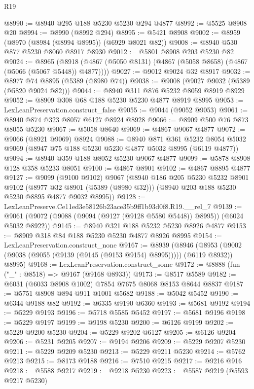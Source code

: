 \begin{lexlean}{R19}
\begin{coremodule}
@8990 := @8940 @295 @188 @5230 @5230 @294 @4877
@8992 := @5525 @8908 @20
@8994 := @8990 (@8992 @294)
@8995 := @5421 @8908
@9002 := @8959 (@8970 (@8984 (@8994 @8995)) (@6929 @8021 @82))
@9008 := @8940 @530 @877 @5230 @8060 @8917 @8930
@9012 := @5801 @8908 @203 @5230 @82
@9024 := @8965
    (@8918 (@4867 (@5050 @8131) (@4867 (@5058 @8658) (@4867 (@5066 (@5067 @5448)) @4877))))
@9027 := @9012 @9024 @32 @8917
@9032 := @8977 @74 @8895 (@5389 (@8980 @74))
@9038 := @9008 (@9027 @9032 (@5389 (@5820 @9024 @82)))
@9044 := @8940 @311 @876 @5232 @8059 @8919 @8929
@9052 := @8909 @308 @68 @188 @5230 @5230 @4877 @8919 @8995
@9053 := LexLeanPreservation.construct_false
@9055 := @9044 (@9052 @9053)
@9061 := @8940 @874 @323 @8057 @6127 @8924 @8928
@9066 := @8909 @500 @76 @873 @8055 @5230
@9067 := @5058 @8640
@9069 := @4867 @9067 @4877
@9072 := @9066 (@8921 @9069) @8924
@9088 := @8940
    @871
    @361
    @5232
    @8054
    @5032
    @9069
    (@8947 @75 @188 @5230 @5230 @4877 @5032 @8995 (@6119 @4877))
@9094 := @8940 @359 @188 @8052 @5230 @9067 @4877
@9099 := @5878 @8908 @128 @358 @5233 @8051
@9100 := @4867 @8901
@9102 := @4867 @8895 @4877
@9127 := @9099
    (@9100 @9102)
    @9067
    (@8940
      @186
      @205
      @5230
      @5232
      @8901
      @9102
      (@8977 @32 @8901 (@5389 (@8980 @32)))
      (@8940 @203 @188 @5230 @5230 @8895 @4877 @9032 @8995))
@9128 := LexLeanPreserve.Ce11ed3e58126b23ace35b9ff1b93d0f8.R19.__rel_7
@9139 := @9061 (@9072 (@9088 (@9094 (@9127 (@9128 @5580 @5448)) @8995)) (@6024 @5032 @8922))
@9145 := @8940 @321 @188 @5232 @5230 @8926 @4877
@9153 := @8909 @318 @84 @188 @5230 @5230 @4877 @8926 @8995
@9154 := LexLeanPreservation.construct_none
@9167 := @8939
    (@8946 (@8953 (@9002 (@9038 (@9055 (@9139 (@9145 (@9153 @9154) @8995))))) (@6119 @8932)) @8995)
@9168 := LexLeanPreservation.construct_some
@9172 := @8888 (fun ("_" : @8518) => @9167 (@9168 @8933))
@9173 := @8517 @5589
@9182 := @6031 (@6033 @8908 @1002) @7854 @7675 @8068 @8153 @8644 @8837
@9187 := @5751 @8908 @894 @911 @1001 @5682
@9188 := @5042 @5452
@9190 := @6344 @9188 @82
@9192 := @6335 @9190 @6360
@9193 := @5681 @9192
@9194 := @5229 @9193
@9196 := @5718 @5585 @5452
@9197 := @5681 @9196
@9198 := @5229 @9197
@9199 := @9198 @5230
@9200 := @6126 @9199
@9202 := @5229 @9200 @5230
@9204 := @5229 @9202 @6127
@9205 := @6126 @9204
@9206 := @5231 @9205
@9207 := @9194 @9206
@9209 := @5229 @9207 @5230
@9211 := @5229 @9209 @5230
@9213 := @5229 @9211 @5230
@9214 := @5762 @9213
@9215 := @8173 @9188
@9216 := @7510 @9215
@9217 := @9216 @916
@9218 := @5588 @9217
@9219 := @9218 @5230
@9223 := @5587 @9219 (@5593 @9217 @5230)

\end{coremodule}
\end{lexlean}
